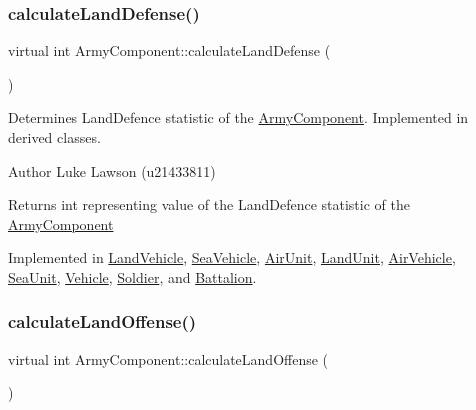 \subsubsection{\texorpdfstring{calculateLandDefense()}{calculateLandDefense()}}
{\footnotesize\ttfamily virtual int Army\+Component\+::calculate\+Land\+Defense (\begin{DoxyParamCaption}{ }\end{DoxyParamCaption})\hspace{0.3cm}{\ttfamily [pure virtual]}}



Determines Land\+Defence statistic of the \mbox{\hyperlink{class_army_component}{Army\+Component}}. Implemented in derived classes. 

\begin{DoxyAuthor}{Author}
Luke Lawson (u21433811) 
\end{DoxyAuthor}
\begin{DoxyReturn}{Returns}
int representing value of the Land\+Defence statistic of the \mbox{\hyperlink{class_army_component}{Army\+Component}} 
\end{DoxyReturn}


Implemented in \mbox{\hyperlink{class_land_vehicle_aa294605ab1e7a30d2b62b51aa3957713}{Land\+Vehicle}}, \mbox{\hyperlink{class_sea_vehicle_a0c86a5fe86057562bb7e7547e0183c8d}{Sea\+Vehicle}}, \mbox{\hyperlink{class_air_unit_a5d408669d099d55d1bb19f71d6dc8712}{Air\+Unit}}, \mbox{\hyperlink{class_land_unit_acffd7525b2d214be433fe77ecf5610df}{Land\+Unit}}, \mbox{\hyperlink{class_air_vehicle_acb7d32241e484f1ece2123451f061168}{Air\+Vehicle}}, \mbox{\hyperlink{class_sea_unit_a5fa9cb7bedbe58346fcd22fdd7ca855b}{Sea\+Unit}}, \mbox{\hyperlink{class_vehicle_a155724a3ab7689c7bafb970ad47ac0df}{Vehicle}}, \mbox{\hyperlink{class_soldier_ab37165b4ce8fbe4a24a759c81ece58c4}{Soldier}}, and \mbox{\hyperlink{class_battalion_a1285a61a5fa793a18bc8122a036d3ac3}{Battalion}}.

\mbox{\label{class_army_component_a0556ff6dbfa956f9ab52aadaa6a331e1}} 
\subsubsection{\texorpdfstring{calculateLandOffense()}{calculateLandOffense()}}
{\footnotesize\ttfamily virtual int Army\+Component\+::calculate\+Land\+Offense (\begin{DoxyParamCaption}{ }\end{DoxyParamCaption})\hspace{0.3cm}{\ttfamily [pure virtual]}}



